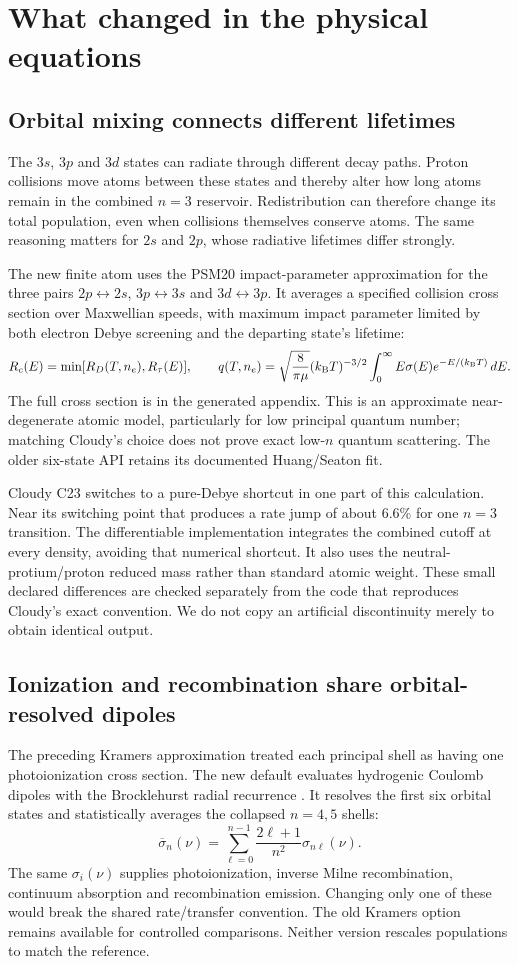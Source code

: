 \documentclass[11pt,a4paper]{article}
\begin{document}
\section{What changed in the physical equations}
\subsection{Orbital mixing connects different lifetimes}
The $3s$, $3p$ and $3d$ states can radiate through different decay paths.
Proton collisions move atoms between these states and thereby alter how long
atoms remain in the combined $n=3$ reservoir. Redistribution can therefore
change its total population, even when collisions themselves conserve atoms.
The same reasoning matters for $2s$ and $2p$, whose radiative lifetimes differ
strongly.

The new finite atom uses the PSM20 impact-parameter approximation
\cite{badnell} for the three pairs $2p\leftrightarrow2s$,
$3p\leftrightarrow3s$ and $3d\leftrightarrow3p$. It averages a specified
collision cross section over Maxwellian speeds, with maximum impact parameter
limited by both electron Debye screening and the departing state's lifetime:
\[
R_c(E)=\min[R_D(T,n_e),R_\tau(E)],\qquad
q(T,n_e)=\sqrt{\frac{8}{\pi\mu}}(k_{\rm B}T)^{-3/2}
\int_0^\infty E\sigma(E)e^{-E/(k_{\rm B}T)}\,dE.
\]
The full cross section is in the generated appendix. This is an approximate
near-degenerate atomic model, particularly for low principal quantum number;
matching Cloudy's choice does not prove exact low-$n$ quantum scattering.
The older six-state API retains its documented Huang/Seaton fit.

Cloudy C23 switches to a pure-Debye shortcut in one part of this calculation.
Near its switching point that produces a rate jump of about 6.6\% for one
$n=3$ transition. The differentiable implementation integrates the combined
cutoff at every density, avoiding that numerical shortcut. It also uses the
neutral-protium/proton reduced mass rather than standard atomic weight.
These small declared differences are checked separately from the code that
reproduces Cloudy's exact convention. We do not copy an artificial discontinuity
merely to obtain identical output.

\subsection{Ionization and recombination share orbital-resolved dipoles}
The preceding Kramers approximation treated each principal shell as having
one photoionization cross section. The new default evaluates hydrogenic
Coulomb dipoles with the Brocklehurst radial recurrence
\cite{brocklehurst,cloudy}. It resolves the first six orbital states and
statistically averages the collapsed $n=4,5$ shells:
\[
\overline\sigma_n(\nu)=\sum_{\ell=0}^{n-1}
\frac{2\ell+1}{n^2}\sigma_{n\ell}(\nu).
\]
The same $\sigma_i(\nu)$ supplies photoionization, inverse Milne recombination,
continuum absorption and recombination emission. Changing only one of these
would break the shared rate/transfer convention. The old Kramers option remains
available for controlled comparisons. Neither version rescales populations
to match the reference.
\end{document}
